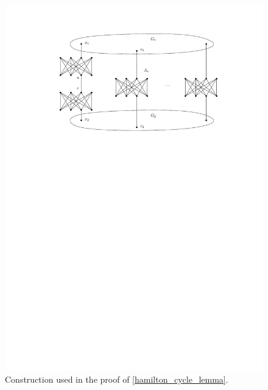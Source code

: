 \documentclass[runningheads]{llncs}
\begin{document}
\begin{figure}[htpb]
\centering
\includegraphics[scale=0.92]{img/hamilton-prime}
\caption{Construction used in the proof of \cref{hamilton_cycle_lemma}.}
\label{fig_hamilton_cycle_lemma}
\end{figure}
\end{document}
